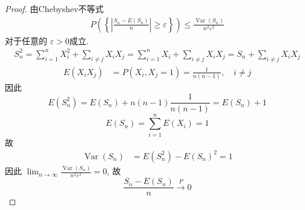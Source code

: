 \documentclass[../main.tex]{subfiles}
\begin{document}
\begin{proof}
 由Chebyshev不等式
  $$ \begin{aligned} P\left(\left\{ \left| \frac{S_{n}-E\left(S_{n}\right) }{n } \right|\ge  \varepsilon   \right\}\right) \le \frac{\operatorname{Var}\left(S_{n}\right) }{n^{2} \varepsilon ^{2} }\end{aligned} $$ 
对于任意的 $\varepsilon > 0$成立.
  $$ \begin{aligned} S_{n}^{2}= \sum _{i= 1}^{n}X_{i}^{2}+ \sum _{i\neq j}X_{i}X_{j}= \sum _{i= 1}^{n}X_{i}+ \sum _{i\neq j}X_{i}X_{j}= S_{n}+ \sum _{i \neq j}X_{i}X_{j} \end{aligned} $$
  $$ \begin{aligned} E\left(X_{i}X_{j}\right)&= P\left(X_{i},X_{j}= 1\right)= \frac{1 }{n\left(n-1\right) },\quad i\neq j \end{aligned} $$
因此
 $$ E\left(S_{n}^{2}\right)= E\left(S_{n}\right)+ n\left(n-1\right)\frac{1 }{n\left(n-1\right) }= E\left(S_{n}\right)+ 1 $$   
  $$ E\left(S_{n}\right)= \sum _{i= 1}^{n}E\left(X_{i}\right)= 1 $$
故
 $$ \begin{aligned} \operatorname{Var}\left(S_{n}\right)&=E\left(S_{n}^{2}\right)- E\left(S_{n}\right)^{2}= 1 \end{aligned} $$
因此 $\lim_{n\to \infty}\frac{\operatorname{Var}\left(S_{n}\right) }{ n^{2}\varepsilon ^{2} }= 0$, 故 
 $$ \frac{S_{n}-E\left(S_{n}\right) }{n }\xrightarrow{P}  0 $$   
\end{proof}
\end{document}

